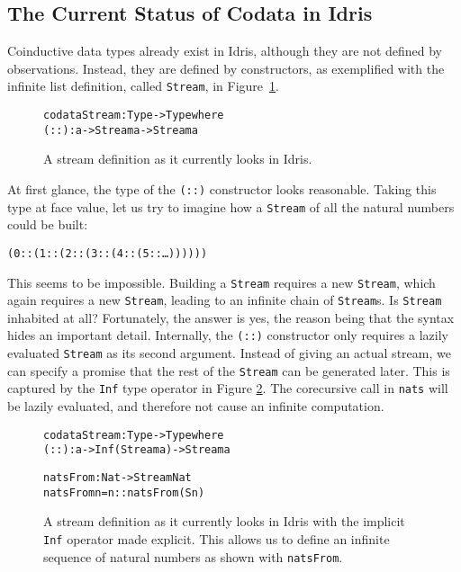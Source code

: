 \subsection{The Current Status of Codata in Idris}
Coinductive data types already exist in Idris, although they are not defined by observations. Instead, they are defined by constructors, as exemplified with the infinite list definition, called \texttt{Stream}, in Figure~\ref{fig:stream_current}.

\begin{figure}
\begin{alltt}
codata Stream : Type -> Type where
  (::) : a -> Stream a -> Stream a
\end{alltt}
\caption{A stream definition as it currently looks in Idris.}
\label{fig:stream_current}
\end{figure}

At first glance, the type of the \texttt{(::)} constructor looks reasonable. Taking this type at face value, let us try to imagine how a \texttt{Stream} of all the natural numbers could be built:

\begin{alltt}
(0 :: (1 :: (2 :: (3 :: (4 :: (5 :: \ldots))))))
\end{alltt}

This seems to be impossible. Building a \texttt{Stream} requires a new \texttt{Stream}, which again requires a new \texttt{Stream}, leading to an infinite chain of \texttt{Stream}s. Is \texttt{Stream} inhabited at all? Fortunately, the answer is yes, the reason being that the syntax hides an important detail. Internally, the \texttt{(::)} constructor only requires a lazily evaluated \texttt{Stream} as its second argument. Instead of giving an actual stream, we can specify a promise that the rest of the \texttt{Stream} can be generated later. This is captured by the \texttt{Inf} type operator in Figure \ref{fig:stream_current_Inf_and_natsFrom}. The corecursive call in \texttt{nats} will be lazily evaluated, and therefore not cause an infinite computation.

\begin{figure}
\begin{alltt}
codata Stream : Type -> Type where
  (::) : a -> Inf (Stream a) -> Stream a

natsFrom : Nat -> Stream Nat
natsFrom n = n :: natsFrom (S n)
\end{alltt}
\caption{A stream definition as it currently looks in Idris with the implicit \texttt{Inf} operator made explicit. This allows us to define an infinite sequence of natural numbers as shown with \texttt{natsFrom}.}
\label{fig:stream_current_Inf_and_natsFrom}
\end{figure}


